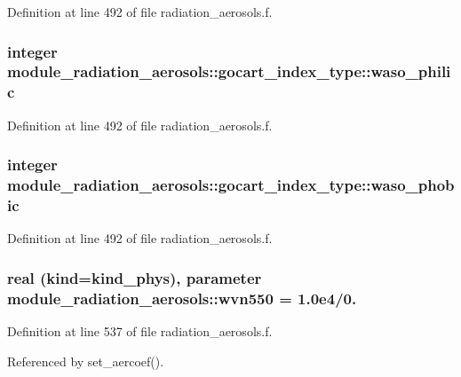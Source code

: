 Definition at line 492 of file radiation\+\_\+aerosols.\+f.

\subsubsection[{\texorpdfstring{waso\+\_\+philic}{waso_philic}}]{\setlength{\rightskip}{0pt plus 5cm}integer module\+\_\+radiation\+\_\+aerosols\+::gocart\+\_\+index\+\_\+type\+::waso\+\_\+philic\hspace{0.3cm}{\ttfamily [private]}}\hypertarget{group__module__radiation__aerosols_ga05425c83c167f7820a126c72e561a4da}{}\label{group__module__radiation__aerosols_ga05425c83c167f7820a126c72e561a4da}


Definition at line 492 of file radiation\+\_\+aerosols.\+f.

\subsubsection[{\texorpdfstring{waso\+\_\+phobic}{waso_phobic}}]{\setlength{\rightskip}{0pt plus 5cm}integer module\+\_\+radiation\+\_\+aerosols\+::gocart\+\_\+index\+\_\+type\+::waso\+\_\+phobic\hspace{0.3cm}{\ttfamily [private]}}\hypertarget{group__module__radiation__aerosols_ga9975caaff0c49d25180699beb469601f}{}\label{group__module__radiation__aerosols_ga9975caaff0c49d25180699beb469601f}


Definition at line 492 of file radiation\+\_\+aerosols.\+f.

\subsubsection[{\texorpdfstring{wvn550}{wvn550}}]{\setlength{\rightskip}{0pt plus 5cm}real (kind=kind\+\_\+phys), parameter module\+\_\+radiation\+\_\+aerosols\+::wvn550 = 1.\+0e4/0.\hspace{0.3cm}{\ttfamily [private]}}\hypertarget{group__module__radiation__aerosols_ga4555a127ac5bab48353628ea81c55e4e}{}\label{group__module__radiation__aerosols_ga4555a127ac5bab48353628ea81c55e4e}


Definition at line 537 of file radiation\+\_\+aerosols.\+f.



Referenced by set\+\_\+aercoef().

